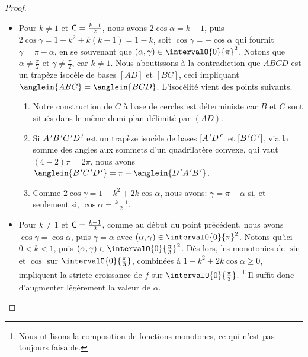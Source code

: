 \begin{proof}
\begin{itemize}
	    \item Pour $k \neq 1$ et $\mathsf{C} = \frac{k - 1}{2}$,
	    nous avons $2\cos \alpha = k - 1$, 
	    puis 
	    $2 \cos \gamma = 1 - k^2 + k(k - 1) = 1 - k$,
	    soit
	    $\cos \gamma = - \cos \alpha$ qui fournit
	    $\gamma = \pi - \alpha$, en se souvenant que $(\alpha , \gamma) \in \intervalO{0}{\pi}^2$.
	    Notons que $\alpha \neq \frac{\pi}{2}$ et $\gamma \neq \frac{\pi}{2}$, car $k \neq 1$. 
	    Nous aboutissons à la contradiction que $ABCD$ est un trapèze isocèle de bases $[AD]$ et $[BC]$, ceci impliquant $\anglein{ABC} = \anglein{BCD}$. 
	    L'isocélité vient des points suivants.
	    \begin{enumerate}
	        \item Notre construction de $C$ à base de cercles est déterministe car $B$ et $C$ sont situés dans le même demi-plan délimité par $(AD)$.

	        \item Si $A^{\,\prime} B^{\,\prime} C^{\,\prime} D^{\,\prime}$ est un trapèze isocèle de bases $[A^{\,\prime} D^{\,\prime}]$ et $[B^{\,\prime} C^{\,\prime}]$, via la somme des angles aux sommets d'un quadrilatère convexe, qui vaut $(4 - 2) \pi = 2 \pi$, nous avons
	        $\anglein{\primeit{B} \primeit{C} \primeit{D}} = \pi - \anglein{\primeit{D} \primeit{A} \primeit{B}}$.

	        \item Comme $2 \cos \gamma = 1 - k^2 + 2 k \cos \alpha$, nous avons:
	        $\gamma = \pi - \alpha$ si, et seulement si, $\cos \alpha = \frac{k - 1}{2}$.
	    \end{enumerate}


	    \item Pour $k \neq 1$ et $\mathsf{C} = \frac{k + 1}{2}$,
	    comme au début du point précédent,
	    nous avons $\cos \gamma = \cos \alpha$, puis $\gamma = \alpha$ avec $(\alpha , \gamma) \in \intervalO{0}{\pi}^2$.
	    Notons qu'ici $0 < k < 1$, puis $(\alpha , \gamma) \in \intervalO{0}{\frac{\pi}{3}}^2$.
	    Dès lors, les monotonies de $\sin$ et $\cos$ sur $\intervalO{0}{\frac{\pi}{3}}$, combinées à $1 - k^2 + 2 k \cos \alpha \geq 0$, impliquent la stricte croissance de $f$ sur $\intervalO{0}{\frac{\pi}{3}}$.%
	    \footnote{
	    	Nous utilisons la composition de fonctions monotones, ce qui n'est pas toujours faisable.
	    }
	    Il suffit donc d'augmenter légèrement la valeur de  $\alpha$.
	\end{itemize}
	
	\null\vspace{-6ex}
\end{proof}


